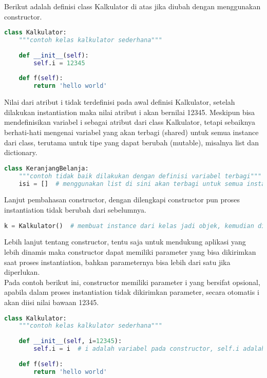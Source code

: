 Berikut adalah definisi class Kalkulator di atas jika diubah dengan menggunakan constructor.
\begin{lstlisting}[language=Python]
class Kalkulator:
    """contoh kelas kalkulator sederhana"""
 
    def __init__(self):
        self.i = 12345
 
    def f(self):
        return 'hello world'
\end{lstlisting}

Nilai dari atribut i tidak terdefinisi pada awal definisi Kalkulator, setelah dilakukan instantiation maka nilai atribut i akan bernilai 12345. Meskipun bisa mendefinisikan variabel i sebagai atribut dari class Kalkulator, tetapi sebaiknya berhati-hati mengenai variabel yang akan terbagi (shared) untuk semua instance dari class, terutama untuk tipe yang dapat berubah (mutable), misalnya list dan dictionary.

\begin{lstlisting}[language=Python]
class KeranjangBelanja:
    """contoh tidak baik dilakukan dengan definisi variabel terbagi"""
    isi = []  # menggunakan list di sini akan terbagi untuk semua instance. JANGAN DILAKUKAN
\end{lstlisting}

Lanjut pembahasan constructor, dengan dilengkapi constructor pun proses instantiation tidak berubah dari sebelumnya.
\begin{lstlisting}[language=Python]
k = Kalkulator()  # membuat instance dari kelas jadi objek, kemudian disimpan pada variabel k
\end{lstlisting}

Lebih lanjut tentang constructor, tentu saja untuk mendukung aplikasi yang lebih dinamis maka constructor dapat memiliki parameter yang bisa dikirimkan saat proses instantiation, bahkan parameternya bisa lebih dari satu jika diperlukan.\\

Pada contoh berikut ini, constructor memiliki parameter i yang bersifat opsional, apabila dalam proses instantiation tidak dikirimkan parameter, secara otomatis i akan diisi nilai bawaan 12345.
\begin{lstlisting}[language=Python]
class Kalkulator:
    """contoh kelas kalkulator sederhana"""
 
    def __init__(self, i=12345):
        self.i = i  # i adalah variabel pada constructor, self.i adalah variabel dari class
 
    def f(self):
        return 'hello world'
\end{lstlisting}

